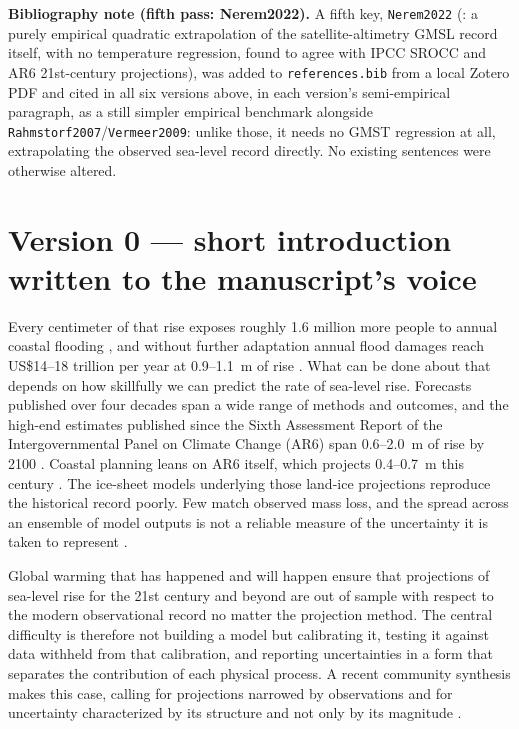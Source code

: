 \documentclass[12pt]{article}
\begin{document}
\noindent\textbf{Bibliography note (fifth pass: Nerem2022).} A fifth key,
\texttt{Nerem2022} (\citealt{Nerem2022}: a purely empirical quadratic
extrapolation of the satellite-altimetry GMSL record itself, with no
temperature regression, found to agree with IPCC SROCC and AR6 21st-century
projections), was added to \texttt{references.bib} from a local Zotero PDF
and cited in all six versions above, in each version's semi-empirical
paragraph, as a still simpler empirical benchmark alongside
\texttt{Rahmstorf2007}/\texttt{Vermeer2009}: unlike those, it needs no
GMST regression at all, extrapolating the observed sea-level record
directly. No existing sentences were otherwise altered.

\section*{Version 0 --- short introduction written to the manuscript's voice}


Every centimeter of that rise exposes roughly 1.6 million more people to annual coastal
flooding \citep{Kulp2019}, and without further adaptation annual flood damages reach
US\$14--18 trillion per year at 0.9--1.1~m of rise \citep{Jevrejeva2018}. What can be
done about that depends on how skillfully we can predict the rate of sea-level rise. Forecasts published over four decades span a wide range of methods and outcomes, and the
high-end estimates published since the Sixth Assessment Report of the Intergovernmental
Panel on Climate Change (AR6) span 0.6--2.0~m of rise by 2100 \citep{Garner2026}. Coastal
planning leans on AR6 itself, which projects 0.4--0.7~m this century
\citep{Fox-Kemper2021,Hirschfeld2023}. The ice-sheet models underlying those land-ice
projections reproduce the historical record poorly. Few match observed mass loss, and the
spread across an ensemble of model outputs is not a reliable measure of the uncertainty it
is taken to represent \citep{Aschwanden2021}. 

Global warming that has happened and will happen ensure that projections of sea-level rise for the 21st century and beyond are out of sample with respect to the modern observational record no matter the projection method. The central difficulty is therefore not building a model but calibrating it, testing it against data
withheld from that calibration, and reporting uncertainties in a form that separates the
contribution of each physical process. A recent community synthesis makes this
case, calling for projections narrowed by observations and for uncertainty characterized
by its structure and not only by its magnitude \citep{Felikson2025}.
\end{document}
